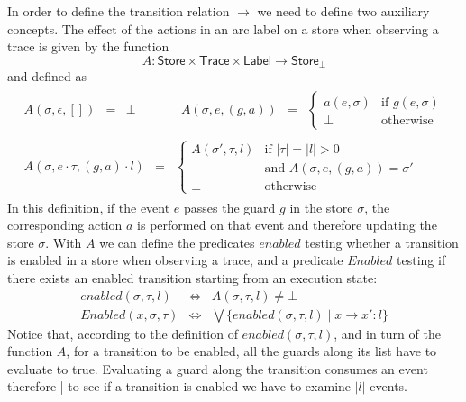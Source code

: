 \documentclass{llncs} %
\newcommand{\set}[1]{\ensuremath{\mathsf{#1}}}
\begin{document}
In order to define the transition relation $\to$ we need to define two auxiliary concepts. 
The effect of the actions in an arc label on a store when observing a trace is given by the function
\[
   A : \set{Store} \times \set{Trace} \times \set{Label} \to \set{Store}_\bot
\] and defined as
%
\[
\begin{array}{c}
\begin{array}{lclclcl}
A(\sigma,\epsilon,[]) & = & \bot
& \qquad &
A(\sigma,e,(g,a)) & = & \left\{\begin{array}{ll}
     a(e,\sigma) & \mbox{if $g(e,\sigma)$}
     \\[1ex]
     \bot & \mbox{otherwise}
     \end{array}
     \right.
\end{array}
\\[4ex]
\begin{array}{lcl}
A(\sigma,e\cdot \tau,(g,a)\cdot l) & = & \left\{\begin{array}{ll}
     A(\sigma',\tau,l) & \mbox{if $|\tau|=|l|>0$} 
     \\
& \mbox{and  $A(\sigma,e,(g,a))=\sigma'$}
     \\[1ex]
     \bot & \mbox{otherwise}
     \end{array}
     \right.
\end{array}
\end{array}\]
In this definition, if the event $e$ passes the guard $g$ in the store $\sigma$, the corresponding action $a$ is performed on that event
and therefore updating the store $\sigma$.
With $A$ we can define the predicates $enabled$
testing whether a transition is enabled in a store when observing a trace,  and a predicate
$Enabled$ testing if there exists an enabled transition starting from an execution state:
\begin{eqnarray*}
enabled(\sigma,\tau,l) & \Leftrightarrow & A(\sigma,\tau,l) \neq \bot
\\
Enabled(x,\sigma,\tau) & \Leftrightarrow  & \bigvee \{ enabled(\sigma,\tau,l) \mid x \to x' : l \}
\end{eqnarray*}
Notice that, according to the definition of $enabled(\sigma,\tau,l)$, and in turn of the function $A$, 
for a transition to be enabled, all the guards along its
list have to evaluate to true. Evaluating a guard along the transition consumes
an event |  therefore | to see if a transition is enabled 
we have to examine $|l|$ events. 
\end{document}
